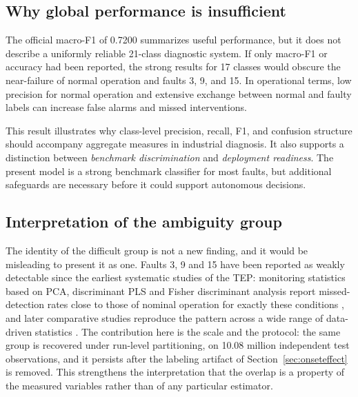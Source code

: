 \documentclass[12pt,a4paper]{article}
\begin{document}
\subsection{Why global performance is insufficient}

The official macro-F1 of 0.7200 summarizes useful performance, but it does not
describe a uniformly reliable 21-class diagnostic system. If only macro-F1 or
accuracy had been reported, the strong results for 17 classes would obscure
the near-failure of normal operation and faults 3, 9, and 15. In operational
terms, low precision for normal operation and extensive exchange between normal
and faulty labels can increase false alarms and missed interventions.

This result illustrates why class-level precision, recall, F1, and confusion
structure should accompany aggregate measures in industrial diagnosis. It also
supports a distinction between \emph{benchmark discrimination} and
\emph{deployment readiness}. The present model is a strong benchmark
classifier for most faults, but additional safeguards are necessary before it
could support autonomous decisions.

\subsection{Interpretation of the ambiguity group}

The identity of the difficult group is not a new finding, and it would be
misleading to present it as one. Faults 3, 9 and 15 have been reported as
weakly detectable since the earliest systematic studies of the TEP: monitoring
statistics based on PCA, discriminant PLS and Fisher discriminant analysis
report missed-detection rates close to those of nominal operation for exactly
these conditions \cite{chiang2000discriminant,chiang2001book}, and later
comparative studies reproduce the pattern across a wide range of data-driven
statistics \cite{yin2012comparison}. The contribution here is the scale and the
protocol: the same group is recovered under run-level partitioning, on 10.08
million independent test observations, and it persists after the labeling
artifact of Section~\ref{sec:onseteffect} is removed. This strengthens the
interpretation that the overlap is a property of the measured variables rather
than of any particular estimator.
\end{document}
